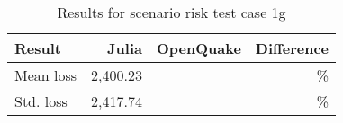 \begin{table}[htbp]

\centering
\begin{tabular}{ l r r r }

\hline
\rowcolor{anti-flashwhite}
\bf{Result} & \bf{Julia} & \bf{OpenQuake} & \bf{Difference}\\
\hline
Mean loss & 2,400.23 &  & \% \\
Std. loss & 2,417.74 &  & \% \\
\hline
\end{tabular}

\caption{Results for scenario risk test case 1g}
\label{tab:result-sr-1g}
\end{table}

